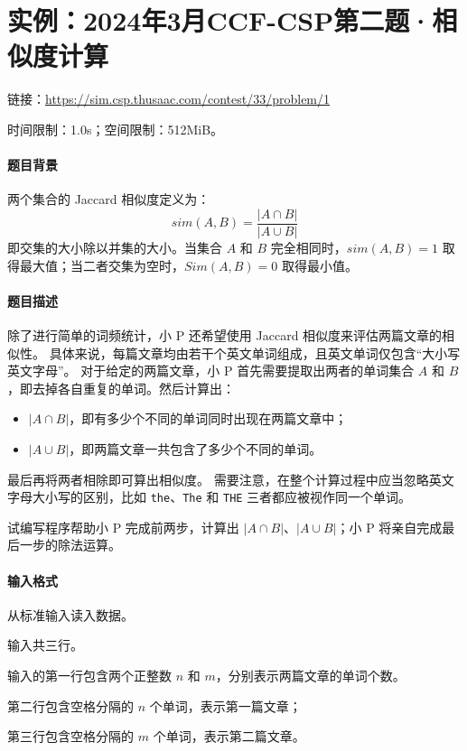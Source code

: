 \documentclass[UTF8]{ctexart}
\begin{document}
\section{实例：2024年3月CCF-CSP第二题·相似度计算}
{\small
链接：\url{https://sim.csp.thusaac.com/contest/33/problem/1}

时间限制：1.0s；空间限制：512MiB。

\paragraph{题目背景}
两个集合的 Jaccard 相似度定义为：
\begin{equation*}
    sim(A,B) = \dfrac{|A\cap B|}{|A\cup B|}
\end{equation*}
即交集的大小除以并集的大小。当集合 $A$ 和 $B$ 完全相同时，$sim(A,B)=1$ 取得最大值；当二者交集为空时，$Sim(A,B)=0$ 取得最小值。

\paragraph{题目描述}
除了进行简单的词频统计，小 P 还希望使用 Jaccard 相似度来评估两篇文章的相似性。 具体来说，每篇文章均由若干个英文单词组成，且英文单词仅包含“大小写英文字母”。 对于给定的两篇文章，小 P 首先需要提取出两者的单词集合 $A$ 和 $B$，即去掉各自重复的单词。然后计算出：
\begin{itemize}
    \item $|A\cap B|$，即有多少个不同的单词同时出现在两篇文章中；
    \item $|A\cup B|$，即两篇文章一共包含了多少个不同的单词。
\end{itemize}
最后再将两者相除即可算出相似度。 需要注意，在整个计算过程中应当忽略英文字母大小写的区别，比如 \verb!the!、\verb!The! 和 \verb!THE! 三者都应被视作同一个单词。

试编写程序帮助小 P 完成前两步，计算出 $|A\cap B|$、$|A\cup B|$；小 P 将亲自完成最后一步的除法运算。

\paragraph{输入格式}
从标准输入读入数据。

输入共三行。

输入的第一行包含两个正整数 $n$ 和 $m$，分别表示两篇文章的单词个数。

第二行包含空格分隔的 $n$ 个单词，表示第一篇文章；

第三行包含空格分隔的 $m$ 个单词，表示第二篇文章。

}
\end{document}
